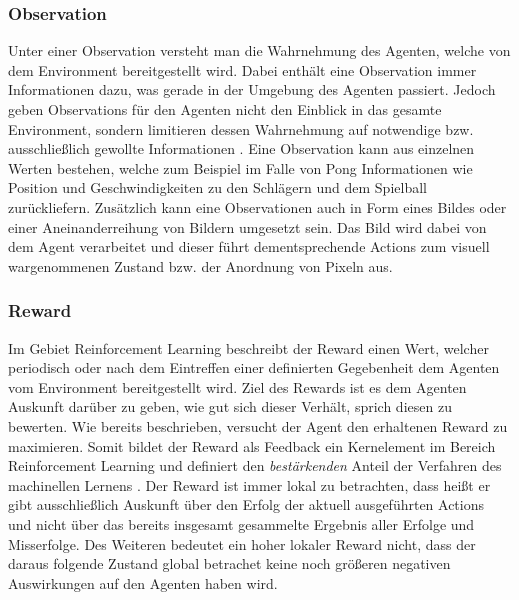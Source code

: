 \documentclass[11pt]{scrartcl}
\begin{document}
\subsubsection{Observation}
Unter einer Observation versteht man die Wahrnehmung des Agenten, welche von dem Environment 
bereitgestellt wird. Dabei enthält eine Observation immer Informationen dazu, was gerade in der
Umgebung des Agenten passiert. Jedoch geben Observations für den Agenten nicht den Einblick
in das gesamte Environment, sondern limitieren dessen Wahrnehmung auf notwendige bzw. ausschließlich
gewollte Informationen \cite[~S.8 f.]{L2018}. Eine Observation kann aus einzelnen Werten bestehen, 
welche zum Beispiel im Falle von Pong Informationen wie Position und Geschwindigkeiten zu den
Schlägern und dem Spielball zurückliefern. Zusätzlich kann eine Observationen auch in Form eines 
Bildes oder einer Aneinanderreihung von Bildern umgesetzt sein. Das Bild wird dabei von 
dem Agent verarbeitet und dieser führt dementsprechende Actions zum visuell wargenommenen Zustand
bzw. der Anordnung von Pixeln aus. 


\subsubsection{Reward}
Im Gebiet Reinforcement Learning beschreibt der Reward einen Wert, welcher periodisch oder nach
dem Eintreffen einer definierten Gegebenheit dem Agenten vom Environment bereitgestellt wird.
Ziel des Rewards ist es dem Agenten Auskunft darüber zu geben, wie gut sich dieser Verhält, sprich
diesen zu bewerten. Wie bereits beschrieben, versucht der Agent den erhaltenen Reward zu
maximieren. Somit bildet der Reward als Feedback ein Kernelement im Bereich Reinforcement
Learning und definiert den \textit{bestärkenden} Anteil der Verfahren des machinellen Lernens 
\cite[~S.6 f.]{L2018}. Der Reward ist immer lokal zu betrachten, dass heißt er gibt ausschließlich 
Auskunft über den Erfolg der aktuell ausgeführten Actions und nicht über das bereits insgesamt
gesammelte Ergebnis aller Erfolge und Misserfolge. Des Weiteren bedeutet ein hoher lokaler Reward 
nicht, dass der daraus folgende Zustand global betrachet keine noch größeren negativen Auswirkungen 
auf den Agenten haben wird.
\end{document}
